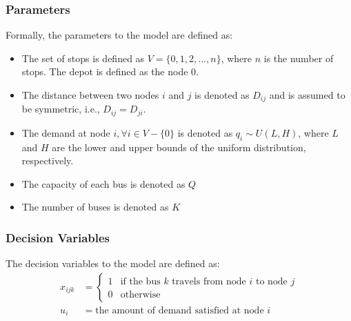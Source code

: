 \documentclass[12pt]{article}
\begin{document}
\subsubsection{Parameters}
Formally, the parameters to the model are defined as:
\begin{itemize}
    \item The set of stops is defined as $V = \{0, 1, 2, ..., n\}$, where $n$ is the number of stops. The depot is defined as the node ${0}$.
    \item The distance between two nodes $i$ and $j$ is denoted as $D_{ij}$ and is assumed to be symmetric, i.e., $D_{ij} = D_{ji}$.
    \item The demand at node $i, \forall i \in V - \{0\}$ is denoted as $q_i \sim U(L, H)$,
          where $L$ and $H$ are the lower and upper bounds of the uniform distribution, respectively.
    \item The capacity of each bus is denoted as $Q$
    \item The number of buses is denoted as $K$

\end{itemize}

\subsubsection{Decision Variables}
The decision variables to the model are defined as:
\begin{align*}
    x_{ijk} & = \begin{cases}
                    1 & \text{if the bus $k$ travels from node $i$ to node $j$} \\
                    0 & \text{otherwise}
                \end{cases} \\
    u_i     & = \text{the amount of demand satisfied at node $i$}
\end{align*}
\end{document}
